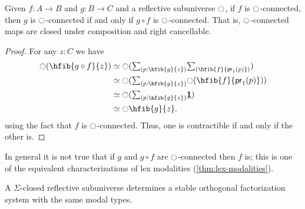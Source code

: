 \begin{lem}\label{thm:rsu-compose-cancel}
  Given $f:A\to B$ and $g:B\to C$ and a reflective subuniverse ${\ocircle}$, if $f$ is ${\ocircle}$-connected, then $g$ is ${\ocircle}$-connected if and only if $g\circ f$ is ${\ocircle}$-connected.
  That is, ${\ocircle}$-connected maps are closed under composition and right cancellable.
\end{lem}
\begin{proof}
  For any $z:C$ we have
  \begin{align*}
    \modal(\hfib{g\circ f}{z})
    & \eqvsym
      \modal(\sm{p:\hfib{g}{z}}\hfib{f}{\proj1(p)}) \\
    & \eqvsym
      \modal(\sm{p:\hfib{g}{z}}\modal(\hfib{f}{\proj1(p)})) \\
    & \eqvsym
      \modal(\sm{p:\hfib{g}{z}}\unit) \\
    & \eqvsym
      \modal\hfib{g}{z}.
  \end{align*}
  using the fact that $f$ is ${\ocircle}$-connected.
  Thus, one is contractible if and only if the other is.
\end{proof}

In general it is not true that if $g$ and $g\circ f$ are ${\ocircle}$-connected then $f$ is; this is one of the equivalent characterizations of lex modalities (\cref{thm:lex-modalities}).

\begin{thm}\label{thm:sofs_from_ssrs}
A $\Sigma$-closed reflective subuniverse determines a stable orthogonal factorization system with the same
modal types.
\end{thm}

